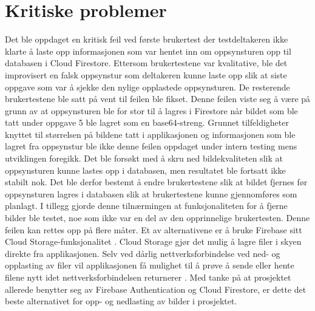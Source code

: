 \section{Kritiske problemer} \label{kritiske_feil}
Det ble oppdaget en kritisk feil ved første brukertest der testdeltakeren ikke klarte å laste opp informasjonen som var hentet inn om oppsynsturen opp til databasen i Cloud Firestore. Ettersom brukertestene var kvalitative, ble det improvisert en falsk oppsynstur som deltakeren kunne laste opp slik at siste oppgave som var å sjekke den nylige opplastede oppsynsturen. De resterende brukertestene ble satt på vent til feilen ble fikset. Denne feilen viste seg å være på grunn av at oppsynsturen ble for stor til å lagres i Firestore når bildet som ble tatt under oppgave 5 ble lagret som en base64-streng.
\newline
\newline
Grunnet tilfeldigheter knyttet til størrelsen på bildene tatt i applikasjonen og informasjonen som ble lagret fra oppsynstur ble ikke denne feilen oppdaget under intern testing mens utviklingen foregikk. Det ble forsøkt med å skru ned bildekvaliteten slik at oppsynsturen kunne lastes opp i databasen, men resultatet ble fortsatt ikke stabilt nok. Det ble derfor bestemt å endre brukertestene slik at bildet fjernes før oppsynsturen lagres i databasen slik at brukertestene kunne gjennomføres som planlagt. I tillegg gjorde denne tilnærmingen at funksjonaliteten for å fjerne bilder ble testet, noe som ikke var en del av den opprinnelige brukertesten. 
\newline
\newline
Denne feilen kan rettes opp på flere måter. Et av alternativene er å bruke Firebase sitt Cloud Storage-funksjonalitet \cite{CloudStorageFirebase2021}. Cloud Storage gjør det mulig å lagre filer i skyen direkte fra applikasjonen. Selv ved dårlig nettverksforbindelse ved ned- og opplasting av filer vil applikasjonen få mulighet til å prøve å sende eller hente filene nytt idet nettverksforbindelsen returnerer \cite{CloudStorageFirebase2021}. Med tanke på at prosjektet allerede benytter seg av Firebase Authentication og Cloud Firestore, er dette det beste alternativet for opp- og nedlasting av bilder i prosjektet.

